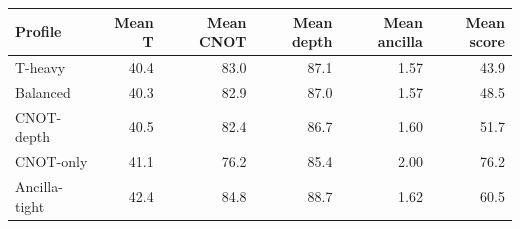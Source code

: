 \begin{tabular}{lrrrrr}
\toprule
Profile & Mean T & Mean CNOT & Mean depth & Mean ancilla & Mean score \\
\midrule
T-heavy & 40.4 & 83.0 & 87.1 & 1.57 & 43.9 \\
Balanced & 40.3 & 82.9 & 87.0 & 1.57 & 48.5 \\
CNOT-depth & 40.5 & 82.4 & 86.7 & 1.60 & 51.7 \\
CNOT-only & 41.1 & 76.2 & 85.4 & 2.00 & 76.2 \\
Ancilla-tight & 42.4 & 84.8 & 88.7 & 1.62 & 60.5 \\
\bottomrule
\end{tabular}
